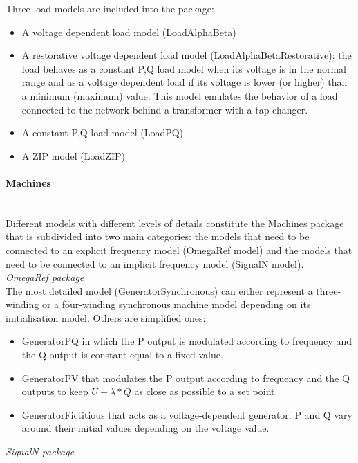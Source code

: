 \documentclass[a4paper, 12pt]{report}
\begin{document}
Three load models are included into the package:
\begin{itemize}
\item A voltage dependent load model (LoadAlphaBeta)
\item A restorative voltage dependent load model (LoadAlphaBetaRestorative): the load behaves as a constant P,Q load model when its voltage is in the normal range and as a voltage dependent load if its voltage is lower (or higher) than a minimum (maximum) value. This model emulates the behavior of a load connected to the network behind a transformer with a tap-changer.
\item A constant P,Q load  model (LoadPQ)
\item A ZIP model (LoadZIP)
\end{itemize}

\paragraph{Machines}
~~\\

Different models with different levels of details constitute the Machines package that is subdivided into two main categories: the models that need to be connected to an explicit frequency model (OmegaRef model) and the models that need to be connected to an implicit frequency model (SignalN model). \\

\textit{OmegaRef package} \\

The most detailed model (GeneratorSynchronous) can either represent a three-winding or a four-winding synchronous machine model depending on its initialisation model. Others are simplified ones:
\begin{itemize}
\item GeneratorPQ in which the P output is modulated according to frequency and the Q output is constant equal to a fixed value.
\item GeneratorPV that modulates the P output according to frequency and the Q outputs to keep $U + \lambda * Q$ as close as possible to a set point.
\item GeneratorFictitious that acts as a voltage-dependent generator. P and Q vary around their initial values depending on the voltage value.
\end{itemize}
\medskip

\textit{SignalN package} \\
\end{document}
